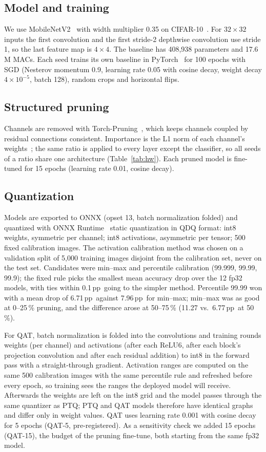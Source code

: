 \documentclass[conference]{IEEEtran}
\newcommand{\pp}{\,pp}
\begin{document}
\subsection{Model and training}
We use MobileNetV2~\cite{sandler2018mobilenetv2} with width multiplier 0.35 on CIFAR-10~\cite{krizhevsky2009cifar}. For $32\times32$ inputs the first convolution and the first stride-2 depthwise convolution use stride 1, so the last feature map is $4\times4$. The baseline has 408{,}938 parameters and 17.6\,M MACs. Each seed trains its own baseline in PyTorch~\cite{paszke2019pytorch} for 100 epochs with SGD (Nesterov momentum 0.9, learning rate 0.05 with cosine decay, weight decay $4\times10^{-5}$, batch 128), random crops and horizontal flips.

\subsection{Structured pruning}
Channels are removed with Torch-Pruning~\cite{fang2023depgraph}, which keeps channels coupled by residual connections consistent. Importance is the L1 norm of each channel's weights~\cite{li2017pruning}; the same ratio is applied to every layer except the classifier, so all seeds of a ratio share one architecture (Table~\ref{tab:hw}). Each pruned model is fine-tuned for 15 epochs (learning rate 0.01, cosine decay).

\subsection{Quantization}
Models are exported to ONNX (opset 13, batch normalization folded) and quantized with ONNX Runtime~\cite{onnxruntime} static quantization in QDQ format: int8 weights, symmetric per channel; int8 activations, asymmetric per tensor; 500 fixed calibration images. The activation calibration method was chosen on a validation split of 5{,}000 training images disjoint from the calibration set, never on the test set. Candidates were min--max and percentile calibration (99.999, 99.99, 99.9); the fixed rule picks the smallest mean accuracy drop over the 12 fp32 models, with ties within 0.1\pp\ going to the simpler method. Percentile 99.99 won with a mean drop of 6.71\pp\ against 7.96\pp\ for min--max; min--max was as good at 0--25\,\% pruning, and the difference arose at 50--75\,\% (11.27 vs.\ 6.77\pp\ at 50\,\%).

For QAT, batch normalization is folded into the convolutions and training rounds weights (per channel) and activations (after each ReLU6, after each block's projection convolution and after each residual addition) to int8 in the forward pass with a straight-through gradient. Activation ranges are computed on the same 500 calibration images with the same percentile rule and refreshed before every epoch, so training sees the ranges the deployed model will receive. Afterwards the weights are left on the int8 grid and the model passes through the same quantizer as PTQ; PTQ and QAT models therefore have identical graphs and differ only in weight values. QAT uses learning rate 0.001 with cosine decay for 5 epochs (QAT-5, pre-registered). As a sensitivity check we added 15 epochs (QAT-15), the budget of the pruning fine-tune, both starting from the same fp32 model.
\end{document}
